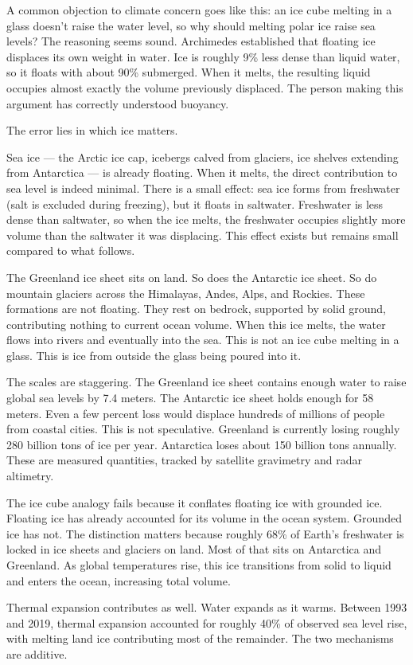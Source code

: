 \begin{commentary}
A common objection to climate concern goes like this: an ice cube melting in a glass doesn't raise the water level, so why should melting polar ice raise sea levels? The reasoning seems sound. Archimedes established that floating ice displaces its own weight in water. Ice is roughly 9\% less dense than liquid water, so it floats with about 90\% submerged. When it melts, the resulting liquid occupies almost exactly the volume previously displaced. The person making this argument has correctly understood buoyancy.

The error lies in which ice matters.

Sea ice — the Arctic ice cap, icebergs calved from glaciers, ice shelves extending from Antarctica — is already floating. When it melts, the direct contribution to sea level is indeed minimal. There is a small effect: sea ice forms from freshwater (salt is excluded during freezing), but it floats in saltwater. Freshwater is less dense than saltwater, so when the ice melts, the freshwater occupies slightly more volume than the saltwater it was displacing. This effect exists but remains small compared to what follows.

The Greenland ice sheet sits on land. So does the Antarctic ice sheet. So do mountain glaciers across the Himalayas, Andes, Alps, and Rockies. These formations are not floating. They rest on bedrock, supported by solid ground, contributing nothing to current ocean volume. When this ice melts, the water flows into rivers and eventually into the sea. This is not an ice cube melting in a glass. This is ice from outside the glass being poured into it.

The scales are staggering. The Greenland ice sheet contains enough water to raise global sea levels by 7.4 meters. The Antarctic ice sheet holds enough for 58 meters. Even a few percent loss would displace hundreds of millions of people from coastal cities. This is not speculative. Greenland is currently losing roughly 280 billion tons of ice per year. Antarctica loses about 150 billion tons annually. These are measured quantities, tracked by satellite gravimetry and radar altimetry.

The ice cube analogy fails because it conflates floating ice with grounded ice. Floating ice has already accounted for its volume in the ocean system. Grounded ice has not. The distinction matters because roughly 68\% of Earth's freshwater is locked in ice sheets and glaciers on land. Most of that sits on Antarctica and Greenland. As global temperatures rise, this ice transitions from solid to liquid and enters the ocean, increasing total volume.

Thermal expansion contributes as well. Water expands as it warms. Between 1993 and 2019, thermal expansion accounted for roughly 40\% of observed sea level rise, with melting land ice contributing most of the remainder. The two mechanisms are additive.
\end{commentary}

